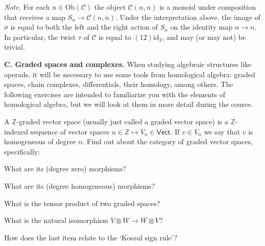 \emph{Note.} For 
each $n\in\mathrm{Ob}(\mathcal C)$ the
object $\mathcal{C}(n,n)$ is a monoid under composition
 that receives a map $S_n\longrightarrow \mathcal{C}(n,n)$.
 Under the interpretation above, the image of $\sigma$
  is equal to both the left and the right action of $S_n$ 
  on the identity map $n\to n$. In particular, the twist
  $\tau$ of $\mathcal{C}$ is equal to $(12)\mathrm{id}_2$,
  and may (or may not) be trivial.
  
  \medskip
  
\textbf{C. Graded spaces and complexes.} When studying
algebraic structures like operads, it will be necessary
to use some tools from homological algebra: graded spaces,
chain complexes, differentials, their homology, among
others. The following exercises are intended to familiarize
you with the elements of homological algebra, but we will
look at them in more detail during the course.

\begin{question} A $\mathbb Z$-graded vector space (usually 
just called a graded vector space) is a $\mathbb Z$-indexed 
sequence of vector spaces $n\in\mathbb Z\longmapsto V_n\in\mathsf{Vect}$. 
If $v\in V_n$ we say that $v$ is homogeneous of
degree $n$. Find out about the category of
graded vector spaces, specifically:
\begin{titemize}
\item What are its (degree zero) morphisms?
\item What are its (degree homogeneous) morphisms?
\item What is the tensor product of two graded spaces?
\item What is the natural isomorphism $V\otimes W\longrightarrow W\otimes V$?
\item How does the last item relate to the `Koszul sign
rule'?
\end{titemize}
\end{question}

